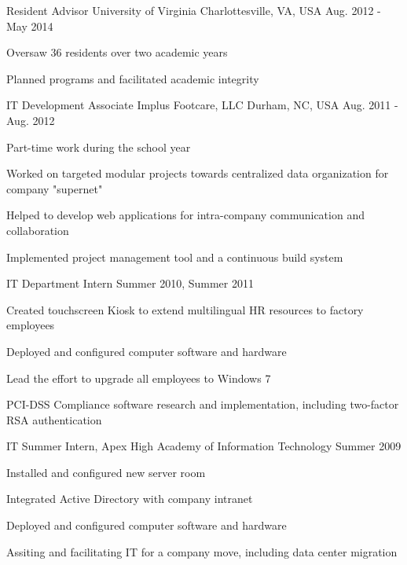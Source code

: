 \begin{cventries}
  \cventry
    {Resident Advisor}
    {University of Virginia}
    {Charlottesville, VA, USA}
    {Aug. 2012 - May 2014}
    {
      \begin{cvitems}
        \item {Oversaw 36 residents over two academic years}
	    \item {Planned programs and facilitated academic integrity}
      \end{cvitems}
    }

  \cventry
    {IT Development Associate}
    {Implus Footcare, LLC}
    {Durham, NC, USA}
    {Aug. 2011 - Aug. 2012}
    {
      \begin{cvitems}
        \item Part-time work during the school year
        \item Worked on targeted modular projects towards centralized data organization for company "supernet"
        \item Helped to develop web applications for intra-company communication and collaboration
        \item Implemented project management tool and a continuous build system
      \end{cvitems}
    }

  \cventry
  {IT Department Intern}
  {}
  {}
  {Summer 2010, Summer 2011}
  {
    \begin{cvitems}
      \item Created touchscreen Kiosk to extend multilingual HR resources to factory employees
      \item Deployed and configured computer software and hardware
      \item Lead the effort to upgrade all employees to Windows 7
      \item PCI-DSS Compliance software research and implementation, including two-factor RSA authentication
    \end{cvitems}
  }

  \cventry
  {IT Summer Intern, Apex High Academy of Information Technology}
  {}
  {}
  {Summer 2009}
  {
    \begin{cvitems}
      \item Installed and configured new server room
      \item Integrated Active Directory with company intranet
      \item Deployed and configured computer software and hardware
      \item Assiting and facilitating IT for a company move, including data center migration
    \end{cvitems}
  }

\end{cventries}
